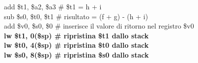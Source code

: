 \documentclass[../main.tex]{subfiles}
\begin{document}
{    \hspace*{0cm} \hspace*{0cm} \hspace*{0cm} \hspace*{0cm} add \$t1, \$a2, \$a3 \hspace*{0cm} \hspace*{0cm} \# \$t1 = h + i \\
    \hspace*{0cm} \hspace*{0cm} \hspace*{0cm} \hspace*{0cm} sub \$s0, \$t0, \$t1 \hspace*{0cm} \hspace*{0cm} \# risultato = (f + g) - (h + i) \\
    \hspace*{0cm} \hspace*{0cm} \hspace*{0cm} \hspace*{0cm} add \$v0, \$s0, \$0 \hspace*{0cm} \hspace*{0cm} \hspace*{0cm} \# inserisce il valore di ritorno nel registro \$v0 \\
    \textbf{\hspace*{0cm} \hspace*{0cm} \hspace*{0cm} \hspace*{0cm} lw \$t1, 0(\$sp) \hspace*{0cm} \hspace*{0cm} \hspace*{0cm} \hspace*{0cm} \hspace*{0cm} \# ripristina \$t1 dallo stack} \\
    \textbf{\hspace*{0cm} \hspace*{0cm} \hspace*{0cm} \hspace*{0cm} lw \$t0, 4(\$sp) \hspace*{0cm} \hspace*{0cm} \hspace*{0cm} \hspace*{0cm} \hspace*{0cm} \# ripristina \$t0 dallo stack} \\
    \textbf{\hspace*{0cm} \hspace*{0cm} \hspace*{0cm} \hspace*{0cm} lw \$s0, 8(\$sp) \hspace*{0cm} \hspace*{0cm} \hspace*{0cm} \hspace*{0cm} \hspace*{0cm} \# ripristina \$s0 dallo stack} \\
}
\end{document}
